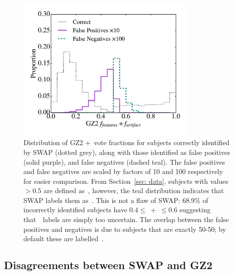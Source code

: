 
\begin{figure}[t!]
\includegraphics[width=3.5in]{Figures/human_machine/f5.pdf}
\caption[$f_{featured}$ distribution of SWAP misclassifications]{Distribution of GZ2 \ffeat+\fstar~vote fractions for subjects correctly identified by SWAP (dotted grey), along with those identified as false positives (solid purple), and false negatives (dashed teal). 
The false positives and false negatives are scaled by factors of 10 and 100 respectively for easier comparison. From Section~\ref{sec: data}, subjects with values $> 0.5$ are defined as~\feat, however, the teal distribution indicates that SWAP labels them as~\notfeat. This is not a flaw of SWAP: 68.9\% of incorrectly identified subjects have $0.4 \le $~\ffeat +\fstar~$ \le 0.6$ suggesting that~\raw~labels are simply too uncertain. The overlap between the false positives and negatives is due to subjects that are exactly 50-50; by default these are labelled~\notfeat. \label{fig: SWAP sucks}}
\end{figure}


\subsection{Disagreements between SWAP and GZ2}\label{sec: swap gz2 disagree}

